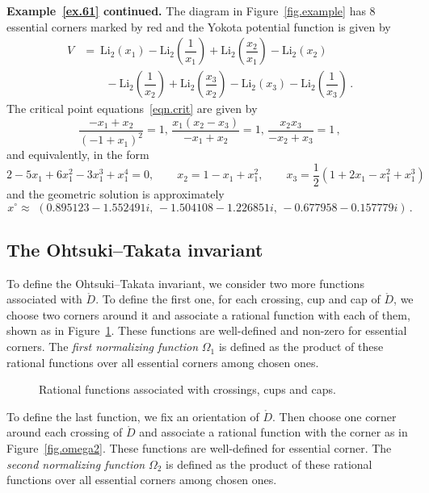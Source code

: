\documentclass[12pt,reqno]{amsart}
\theoremstyle{definition}
\def\li{\mathrm{Li}_2}
\def\be{\begin{equation}}
\def\ee{\end{equation}}
\renewcommand{\Ddot}{\mathring{D}}
\begin{document}
\noindent
{\bf Example~\ref{ex.61} continued.} 
The diagram in Figure~\ref{fig.example} has 8 essential corners marked by red
and the Yokota potential function is given by
\begin{align*}
V & =  \   \li \left( x_1 \right) -\li \left(\dfrac{1}{x_1} \right) + 
\li \left(\dfrac{x_2}{x_1} \right) - \li \left( x_2 \right) \\
& \qquad -  \li \left(\dfrac{1}{x_2} \right) +  \li \left(\dfrac{x_3}{x_2} \right) - 
\li \left(x_3 \right) - \li \left(\dfrac{1}{x_3} \right) \, .
\end{align*}
The critical point equations~\eqref{eqn.crit} are given by
\begin{equation*}
\frac{-x_1+x_2}{(-1+x_1)^2} =1, \, \frac{x_1(x_2-x_3)}{-x_1 + x_2} =1, \,
\frac{x_2 x_3}{-x_2 + x_3} =1 \,,
\end{equation*}
and equivalently, in the form 
\be
2 - 5 x_1 + 6 x_1^2 - 3 x_1^3 + x_1^4 =0, \qquad x_2 = 1 - x_1 + x_1^2, \qquad
x_3 = \frac{1}{2}(1 + 2 x_1 - x_1^2 + x_1^3)
\ee
and the geometric solution is approximately 
\be
\label{61xapp}
x^\circ \approx \,\, (0.895123 -1.552491 i , \, -1.504108 - 1.226851 i, \, 
-0.677958 -0.157779i) \, .
\ee

\subsection{The Ohtsuki--Takata invariant}
\label{sub.OT}

To define the Ohtsuki--Takata invariant, we consider two more functions
associated with $\Ddot$. To define the first one, 
for each crossing, cup and cap of $\Ddot$, we choose two corners
around it and associate a rational function with each of them, shown as in
Figure~\ref{fig.omega1}. These  functions are well-defined and non-zero
for essential corners. The \emph{first normalizing function} $\Omega_1$ is
defined as the product of these rational functions over all essential corners
among chosen ones. 

\begin{figure}[htpb!]
	
	\caption{Rational functions associated with crossings, cups and caps.}
	\label{fig.omega1}
\end{figure}

To define the last function, we fix an orientation of $\Ddot$. Then choose
one corner around 
each crossing of $\Ddot$ and associate a rational function with the corner as
in Figure~\ref{fig.omega2}. These functions are well-defined for essential
corner. The \emph{second normalizing function} $\Omega_2$ is defined as the
product of these rational functions over all essential corners among chosen
ones. 
\end{document}
